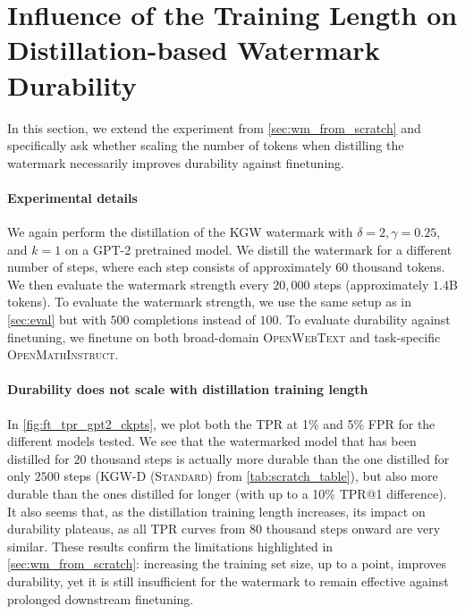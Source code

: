 \section{Influence of the Training Length on Distillation-based Watermark Durability}
\label{app:from_scratch_extended}

In this section, we extend the experiment from \cref{sec:wm_from_scratch} and specifically ask whether scaling the number of tokens when distilling the watermark necessarily improves durability against finetuning.

\paragraph{Experimental details}
We again perform the distillation of the \textsc{KGW} watermark with $\delta=2, \gamma=0.25$, and $k=1$ on a \textsc{GPT-2} pretrained model.  
We distill the watermark for a different number of steps, where each step consists of approximately $60$ thousand tokens.  
We then evaluate the watermark strength every $20{,}000$ steps (\ie approximately $1.4$B tokens).  
To evaluate the watermark strength, we use the same setup as in \cref{sec:eval} but with $500$ completions instead of $100$.  
To evaluate durability against finetuning, we finetune on both broad-domain \textsc{OpenWebText} and task-specific \textsc{OpenMathInstruct}.  

\paragraph{Durability does not scale with distillation training length} 
In \cref{fig:ft_tpr_gpt2_ckpts}, we plot both the TPR at 1\% and 5\% FPR for the different models tested.  
We see that the watermarked model that has been distilled for $20$ thousand steps is actually more durable than the one distilled for only $2500$ steps (\textsc{KGW-D (Standard)} from \cref{tab:scratch_table}), but also more durable than the ones distilled for longer (with up to a 10\% TPR@1 difference).  
It also seems that, as the distillation training length increases, its impact on durability plateaus, as all TPR curves from $80$ thousand steps onward are very similar.  
These results confirm the limitations highlighted in \cref{sec:wm_from_scratch}: increasing the training set size, up to a point, improves durability, yet it is still insufficient for the watermark to remain effective against prolonged downstream finetuning.  



